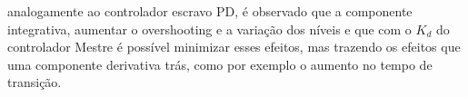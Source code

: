 analogamente ao controlador escravo PD, é observado que a componente integrativa, aumentar o overshooting e a variação dos níveis e
que com o $K_d$ do controlador Mestre é possível minimizar esses efeitos, mas trazendo os efeitos que uma componente derivativa trás,
como por exemplo o aumento no tempo de transição.